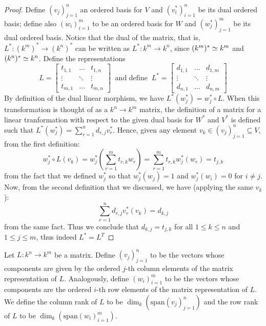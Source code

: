 \begin{proof}
  Define \((v_j)_{j=1}^n\) an ordered basis for \(V\) and \((v_i^\ast)_{i=1}^n\)
  be its dual ordered basis; define also \((w_i)_{i=1}^m\) to be an ordered
  basis for \(W\) and \((w_j^\ast)_{j=1}^m\) be its dual ordered basis. Notice
  that the dual of the matrix, that is, \(L^\ast : (k^m)^\ast \to (k^n)^\ast\)
  can be written as \(L^\ast : k^m \to k^n\), since \((k^m)^\ast \simeq k^m\) and
  \((k^n)^\ast \simeq k^n\). Define the representations
  \[
    L =
    \begin{bmatrix}
      t_{1, 1} & \dots   & t_{1, n} \\
      \vdots   & \ddots  & \vdots   \\
      t_{m, 1} & \dots   & t_{m, n}
    \end{bmatrix}
    \ \text{ and define }\
    L^\ast =
    \begin{bmatrix}
      d_{1, 1} & \dots   & d_{1, m} \\
      \vdots   & \ddots  & \vdots   \\
      d_{n, 1} & \dots   & d_{n, m}
    \end{bmatrix}
  \]
  By definition of the dual linear morphism, we have \(L^\ast(w_j^\ast) =
  w_j^\ast \circ L\). When this transformation is thought of as a \(k^n \to
  k^m\) matrix, the definition of a matrix for a linear tranformation with
  respect to the given dual basis for \(W^\ast\) and \(V^\ast\) is defined such
  that \(L^\ast(w_j^\ast) = \sum_{r = 1}^n d_{r, j} v_r^\ast\). Hence, given any
  element \(v_k \in (v_j)_{j=1}^n \subseteq V\), from the first definition:
  \begin{equation}
    w_j^\ast \circ L (v_k)
    = w_j^\ast \left( \sum_{r=1}^m t_{r, k} w_r \right)
    = \sum_{r=1}^m t_{r, k} w_j^\ast(w_r)
    = t_{j, k}
  \end{equation}
  from the fact that we defined \(w_j^\ast\) so that \(w_j^\ast(w_j) = 1\) and
  \(w_j^\ast(w_i) = 0\) for \(i \neq j\). Now, from the second definition that
  we discussed, we have (applying the same \(v_k\)):
  \begin{equation}
    \sum_{r=1}^n d_{r,j} v_r^\ast(v_k)
    = d_{k, j}
  \end{equation}
  from the same fact. Thus we conclude that \(d_{k,j} = t_{j,k}\) for all \(1
  \leq k \leq n\) and \(1 \leq j \leq m\), thus indeed \(L^\ast = L^T\)
\end{proof}

\begin{definition}\label{def: column and row rank}
  Let \(L: k^n \to k^m\) be a matrix. Define \((v_j)_{j=1}^n\) to be the vectors
  whose components are given by the ordered \(j\)-th column elements of the
  matrix representation of \(L\). Analogously, define \((w_i)_{i=1}^m\) to be
  the vectors whose components are the ordered \(i\)-th row elements of the
  matrix representation of \(L\). We define the column rank of \(L\) to be
  \(\dim_k(\mathrm{span}(v_j)_{j=1}^n)\) and the row rank of \(L\) to be
  \(\dim_k(\mathrm{span}(w_i)_{i=1}^m)\).
\end{definition}

